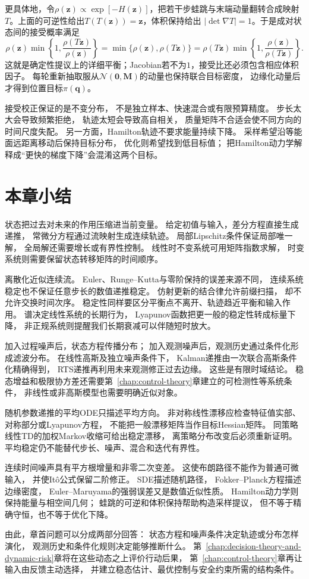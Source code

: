 更具体地，令$\rho(\bm{z})\propto\exp[-H(\bm{z})]$，把若干步蛙跳与末端动量翻转合成映射
$T$。上面的可逆性给出$T(T(\bm{z}))=\bm{z}$，体积保持给出
$|\det\nabla T|=1$。于是成对状态间的接受概率满足
\[
	\rho(\bm{z})\min\!\left\{1,\frac{\rho(T\bm{z})}{\rho(\bm{z})}\right\}
	=\min\{\rho(\bm{z}),\rho(T\bm{z})\}
	=\rho(T\bm{z})\min\!\left\{1,\frac{\rho(\bm{z})}{\rho(T\bm{z})}\right\}.
\]
这就是确定性提议上的详细平衡；Jacobian若不为$1$，接受比还必须包含相应体积因子。
每轮重新抽取服从$\mathcal{N}(\bm{0},\bm{M})$的动量也保持联合目标密度，
边缘化动量后才得到位置目标$\pi(\bm{q})$。

接受校正保证的是不变分布， 不是独立样本、快速混合或有限预算精度。
步长太大会导致频繁拒绝， 轨迹太短会导致高自相关，
质量矩阵不合适会使不同方向的时间尺度失配。
另一方面，Hamilton轨迹不要求能量持续下降。
采样希望沿等能面远距离移动后保持目标分布， 优化则希望找到低目标值；
把Hamilton动力学解释成“更快的梯度下降”会混淆这两个目标。

\section{本章小结}
\label{sec:dynamical-systems-state-estimation-summary}

状态把过去对未来的作用压缩进当前变量。 给定初值与输入，差分方程直接生成递推，
常微分方程通过流映射生成连续轨迹。 局部Lipschitz条件保证局部唯一解，
全局解还需要增长或有界性控制。 线性时不变系统可用矩阵指数求解，
时变系统则需要保留状态转移矩阵的时间顺序。

离散化近似连续流。 Euler、Runge--Kutta与零阶保持的误差来源不同，
连续系统稳定也不保证任意步长的数值递推稳定。 仿射更新的结合律允许前缀扫描，
却不允许交换时间次序。 稳定性同样要区分平衡点不离开、轨迹趋近平衡和输入作用。
谱决定线性系统的长期行为， Lyapunov函数把更一般的稳定性转成标量下降，
非正规系统则提醒我们长期衰减可以伴随短时放大。

加入过程噪声后，状态方程传播分布； 加入观测噪声后，观测历史通过条件化形成滤波分布。
在线性高斯及独立噪声条件下， Kalman递推由一次联合高斯条件化精确得到， RTS递推再利用未来观测修正过去边缘。
这些是有限时域结论。 稳态增益和极限协方差还需要第~\ref{chap:control-theory}章建立的可检测性等系统条件，
非线性或非高斯模型也需要明确近似对象。

随机参数递推的平均ODE只描述平均方向。
非对称线性漂移应检查特征值实部、对称部分或Lyapunov方程，
不能把一般漂移矩阵当作目标Hessian矩阵。 同策略线性TD的加权Markov收缩可给出稳定漂移，
离策略分布改变后必须重新证明。 平均稳定仍不能替代步长、噪声、混合和迭代有界性。

连续时间噪声具有平方根增量和非零二次变差。 这使布朗路径不能作为普通可微输入， 并使Itô公式保留二阶修正。
SDE描述随机路径， Fokker--Planck方程描述边缘密度， Euler--Maruyama的强弱误差又是数值近似性质。
Hamilton动力学则保持能量与相空间几何； 蛙跳的可逆和体积保持帮助构造采样提议， 但不等于精确守恒，也不等于优化下降。

由此，章首问题可以分成两部分回答： 状态方程和噪声条件决定轨迹或分布怎样演化，
观测历史和条件化规则决定能够推断什么。 第~\ref{chap:decision-theory-and-dynamic-risk}章将在这些动态之上评价行动后果，
第~\ref{chap:control-theory}章再让输入由反馈主动选择，
并建立稳态估计、最优控制与安全约束所需的结构条件。
